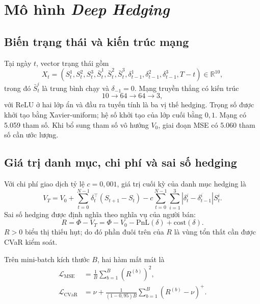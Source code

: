 \section{Mô hình \textit{Deep Hedging}}
\label{sec:c3-hedging-model}

\subsection{Biến trạng thái và kiến trúc mạng}

Tại ngày $t$, vector trạng thái gồm
\begin{equation}
    X_t=\left(S_t^1,S_t^2,S_t^3,
    \bar S_t^1,\bar S_t^2,\bar S_t^3,
    \delta_{t-1}^1,\delta_{t-1}^2,\delta_{t-1}^3,T-t\right)
    \in\mathbb{R}^{10},
    \label{eq:c3-state}
\end{equation}
trong đó $\bar S_t^i$ là trung bình chạy và $\delta_{-1}=0$. Mạng truyền thẳng
có kiến trúc
\begin{equation}
    10\longrightarrow64\longrightarrow64\longrightarrow3,
    \label{eq:c3-architecture}
\end{equation}
với ReLU ở hai lớp ẩn và đầu ra tuyến tính là ba vị thế hedging. Trọng số
được khởi tạo bằng Xavier-uniform; hệ số khởi tạo của lớp cuối bằng $0{,}1$.
Mạng có 5.059 tham số. Khi bổ sung tham số vô hướng $V_0$, giai đoạn MSE có
5.060 tham số cần ước lượng.

\subsection{Giá trị danh mục, chi phí và sai số hedging}

Với chi phí giao dịch tỷ lệ $c=0{,}001$, giá trị cuối kỳ của danh mục hedging là
\begin{equation}
    V_T=V_0+\sum_{t=0}^{N-1}\delta_t^{\top}(S_{t+1}-S_t)
    -c\sum_{t=0}^{N-1}\sum_{i=1}^{3}
    |\delta_t^i-\delta_{t-1}^i|S_t^i.
    \label{eq:c3-terminal-wealth}
\end{equation}
Sai số hedging được định nghĩa theo nghĩa vụ của người bán:
\begin{equation}
    R=\Phi-V_T
    =\Phi-V_0-\mathrm{PnL}(\delta)+\mathrm{cost}(\delta).
    \label{eq:c3-residual}
\end{equation}
$R>0$ biểu thị thiếu hụt; do đó phần đuôi trên của $R$ là vùng tổn thất cần
được CVaR kiểm soát.

Trên mini-batch kích thước $B$, hai hàm mất mát là
\begin{align}
    \mathcal{L}_{\mathrm{MSE}}
    &=\frac{1}{B}\sum_{b=1}^{B}(R^{(b)})^2,
    \label{eq:c3-mse-loss}\\
    \mathcal{L}_{\mathrm{CVaR}}
    &=\nu+\frac{1}{(1-0{,}95)B}
      \sum_{b=1}^{B}(R^{(b)}-\nu)^{+}.
    \label{eq:c3-cvar-loss}
\end{align}

